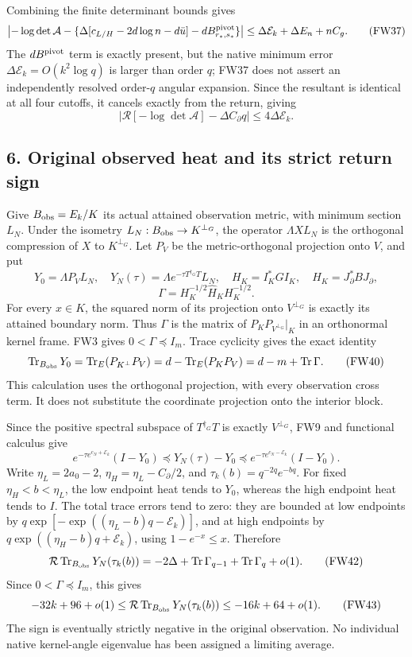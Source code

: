 \documentclass[11pt]{article}
\begin{document}
Combining the finite determinant bounds gives \[
\left|-\log\det\mathcal A-
\{\Delta[c_{L/H}-2d\log n-d\bar u]-dB_{r_*,s_*}^{\rm pivot}\}\right|
\le\Delta\mathcal E_k+\Delta E_n+nC_g.
\tag{FW37}
\] The \(dB^{\rm pivot}\) term is exactly present, but the native minimum error \(\Delta\mathcal E_k=O(k^2\log q)\) is larger than order \(q\); FW37 does not assert an independently resolved order-\(q\) angular expansion. Since the resultant is identical at all four cutoffs, it cancels exactly from the return, giving \[
\left|\mathcal R[-\log\det\mathcal A]-\Delta C_\partial q\right|\le4\Delta\mathcal E_k.
\tag{FW38}
\]

\subsection{6. Original observed heat and its strict return sign}\label{original-observed-heat-and-its-strict-return-sign}

Give \(B_{\rm obs}=E_k/K\) its actual attained observation metric, with minimum section \(L_N\). Under the isometry \(L_N:B_{\rm obs}\to K^{\perp_G}\), the operator \(\Lambda XL_N\) is the orthogonal compression of \(X\) to \(K^{\perp_G}\). Let \(P_V\) be the metric-orthogonal projection onto \(V\), and put \[
Y_0=\Lambda P_VL_N,\quad
Y_N(\tau)=\Lambda e^{-\tau T^{\dagger_G}T}L_N,\quad
H_K=I_K^*GI_K,\quad \widehat H_K=J_\partial^*BJ_\partial,
\] \[
\Gamma=H_K^{-1/2}\widehat H_KH_K^{-1/2}.
\tag{FW39}
\] For every \(x\in K\), the squared norm of its projection onto \(V^{\perp_G}\) is exactly its attained boundary norm. Thus \(\Gamma\) is the matrix of \(P_KP_{V^{\perp_G}}|_K\) in an orthonormal kernel frame. FW3 gives \(0<\Gamma\preceq I_m\). Trace cyclicity gives the exact identity \[
\operatorname{Tr}_{B_{\rm obs}}Y_0
=\operatorname{Tr}_E(P_{K^\perp}P_V)
=d-\operatorname{Tr}_E(P_KP_V)
=d-m+\operatorname{Tr}\Gamma.
\tag{FW40}
\] This calculation uses the orthogonal projection, with every observation cross term. It does not substitute the coordinate projection onto the interior block.

Since the positive spectral subspace of \(T^{\dagger_G}T\) is exactly \(V^{\perp_G}\), FW9 and functional calculus give \[
e^{-\tau e^{c_N+\mathcal E_k}}(I-Y_0)
\preceq Y_N(\tau)-Y_0
\preceq e^{-\tau e^{c_N-\mathcal E_k}}(I-Y_0).
\tag{FW41}
\] Write \(\eta_L=2a_0-2\), \(\eta_H=\eta_L-C_\partial/2\), and \(\tau_k(b)=q^{-2q}e^{-bq}\). For fixed \(\eta_H<b<\eta_L\), the low endpoint heat tends to \(Y_0\), whereas the high endpoint heat tends to \(I\). The total trace errors tend to zero: they are bounded at low endpoints by \(q\exp[-\exp((\eta_L-b)q-\mathcal E_k)]\), and at high endpoints by \(q\exp((\eta_H-b)q+\mathcal E_k)\), using \(1-e^{-x}\le x\). Therefore \[
\mathcal R\operatorname{Tr}_{B_{\rm obs}}Y_N(\tau_k(b))
=-2\Delta+\operatorname{Tr}\Gamma_{q-1}+\operatorname{Tr}\Gamma_q+o(1).
\tag{FW42}
\] Since \(0<\Gamma\preceq I_m\), this gives \[
-32k+96+o(1)\le\mathcal R\operatorname{Tr}_{B_{\rm obs}}Y_N(\tau_k(b))
\le-16k+64+o(1).
\tag{FW43}
\] The sign is eventually strictly negative in the original observation. No individual native kernel-angle eigenvalue has been assigned a limiting average.
\end{document}
